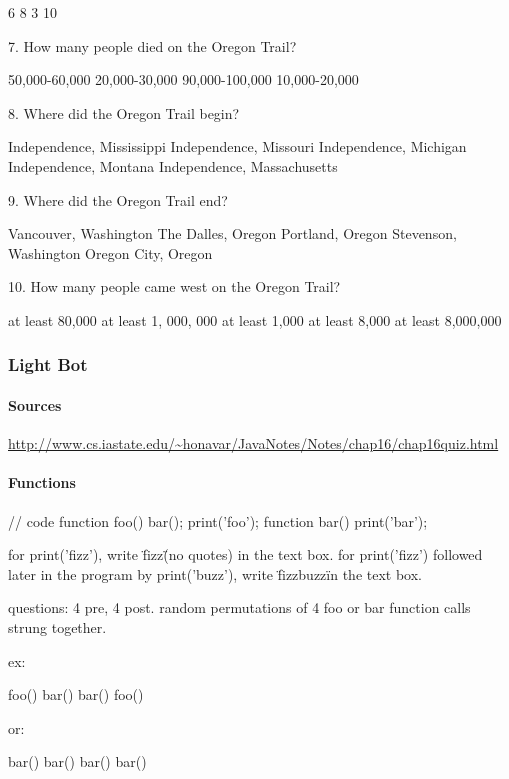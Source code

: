 6
8
3
10

7. How many people died on the Oregon Trail?

50,000-60,000
20,000-30,000
90,000-100,000
10,000-20,000

8. Where did the Oregon Trail begin? 

Independence, Mississippi
Independence, Missouri
Independence, Michigan
Independence, Montana
Independence, Massachusetts

9. Where did the Oregon Trail end?

Vancouver, Washington
The Dalles, Oregon
Portland, Oregon
Stevenson, Washington
Oregon City, Oregon

10. How many people came west on the Oregon Trail?

at least 80,000
at least 1, 000, 000
at least 1,000
at least 8,000
at least 8,000,000
	\subsubsection{Light Bot}
		\paragraph{Sources} \url{http://www.cs.iastate.edu/~honavar/JavaNotes/Notes/chap16/chap16quiz.html}
		\paragraph{Functions} // code
function foo() {
	bar();
	print('foo');
}
function bar() {
	print('bar');
}

for print('fizz'), write \"fizz\" (no quotes) in the text box. for print('fizz') followed later in the program by print('buzz'), write \"fizzbuzz\" in the text box.

questions: 4 pre, 4 post. random permutations of 4 foo or bar function calls strung together.

ex:

foo()
bar()
bar()
foo()

or:

bar()
bar()
bar()
bar()

